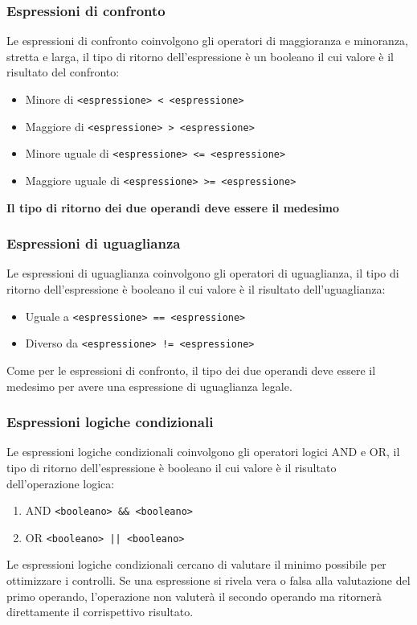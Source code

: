 \subsubsection{Espressioni di confronto}
Le espressioni di confronto coinvolgono gli operatori di maggioranza e minoranza, stretta e larga,
il tipo di ritorno dell'espressione è un booleano il cui valore è il risultato del confronto:
\begin{itemize}
    \item Minore di \lstinline|<espressione> < <espressione>|
    \item Maggiore di \lstinline|<espressione> > <espressione>|
    \item Minore uguale di \lstinline|<espressione> <= <espressione>|
    \item Maggiore uguale di \lstinline|<espressione> >= <espressione>|
\end{itemize}
\textbf{Il tipo di ritorno dei due operandi deve essere il medesimo}

\subsubsection{Espressioni di uguaglianza}
Le espressioni di uguaglianza coinvolgono gli operatori di uguaglianza, 
il tipo di ritorno dell'espressione è booleano il cui valore è il risultato dell'uguaglianza:
\begin{itemize}
    \item Uguale a \lstinline|<espressione> == <espressione>|
    \item Diverso da \lstinline|<espressione> != <espressione>|
\end{itemize}
Come per le espressioni di confronto, il tipo dei due operandi deve essere il medesimo
per avere una espressione di uguaglianza legale.

\subsubsection{Espressioni logiche condizionali}
Le espressioni logiche condizionali coinvolgono gli operatori logici AND e OR,
il tipo di ritorno dell'espressione è booleano il cui valore è il risultato dell'operazione logica:
\begin{enumerate}
    \item AND \lstinline|<booleano> && <booleano>|
    \item OR \lstinline=<booleano> || <booleano>=
\end{enumerate}
Le espressioni logiche condizionali cercano di valutare il minimo possibile per ottimizzare i controlli.
Se una espressione si rivela vera o falsa alla valutazione del primo operando, l'operazione non 
valuterà il secondo operando ma ritornerà direttamente il corrispettivo risultato.

